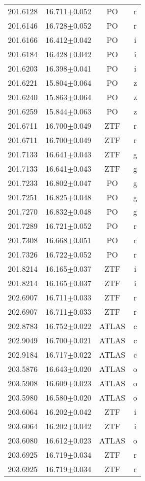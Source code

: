 \begin{table}
\begin{tabular}{cccc}
201.6128 & 16.711$\pm$0.052 & PO & r \\
201.6146 & 16.728$\pm$0.052 & PO & r \\
201.6166 & 16.412$\pm$0.042 & PO & i \\
201.6184 & 16.428$\pm$0.042 & PO & i \\
201.6203 & 16.398$\pm$0.041 & PO & i \\
201.6221 & 15.804$\pm$0.064 & PO & z \\
201.6240 & 15.863$\pm$0.064 & PO & z \\
201.6259 & 15.844$\pm$0.063 & PO & z \\
201.6711 & 16.700$\pm$0.049 & ZTF & r \\
201.6711 & 16.700$\pm$0.049 & ZTF & r \\
201.7133 & 16.641$\pm$0.043 & ZTF & g \\
201.7133 & 16.641$\pm$0.043 & ZTF & g \\
201.7233 & 16.802$\pm$0.047 & PO & g \\
201.7251 & 16.825$\pm$0.048 & PO & g \\
201.7270 & 16.832$\pm$0.048 & PO & g \\
201.7289 & 16.721$\pm$0.052 & PO & r \\
201.7308 & 16.668$\pm$0.051 & PO & r \\
201.7326 & 16.722$\pm$0.052 & PO & r \\
201.8214 & 16.165$\pm$0.037 & ZTF & i \\
201.8214 & 16.165$\pm$0.037 & ZTF & i \\
202.6907 & 16.711$\pm$0.033 & ZTF & r \\
202.6907 & 16.711$\pm$0.033 & ZTF & r \\
202.8783 & 16.752$\pm$0.022 & ATLAS & c \\
202.9049 & 16.700$\pm$0.021 & ATLAS & c \\
202.9184 & 16.717$\pm$0.022 & ATLAS & c \\
203.5876 & 16.643$\pm$0.020 & ATLAS & o \\
203.5908 & 16.609$\pm$0.023 & ATLAS & o \\
203.5980 & 16.580$\pm$0.020 & ATLAS & o \\
203.6064 & 16.202$\pm$0.042 & ZTF & i \\
203.6064 & 16.202$\pm$0.042 & ZTF & i \\
203.6080 & 16.612$\pm$0.023 & ATLAS & o \\
203.6925 & 16.719$\pm$0.034 & ZTF & r \\
203.6925 & 16.719$\pm$0.034 & ZTF & r \\

\end{tabular}
\end{table}
